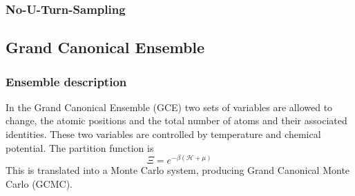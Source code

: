\subsubsection{No-U-Turn-Sampling}

\subsection{Grand Canonical Ensemble}

\subsubsection{Ensemble description}
In the Grand Canonical Ensemble (GCE) two sets of variables are allowed to change, the atomic positions and the total number of atoms and their associated identities.  
These two variables are controlled by temperature and chemical potential.  
The partition function is
\begin{equation}
  \Xi = e^{-\beta(\mathcal{H} +\mu)}
\end{equation}
This is translated into a Monte Carlo system, producing Grand Canonical Monte Carlo (GCMC).
